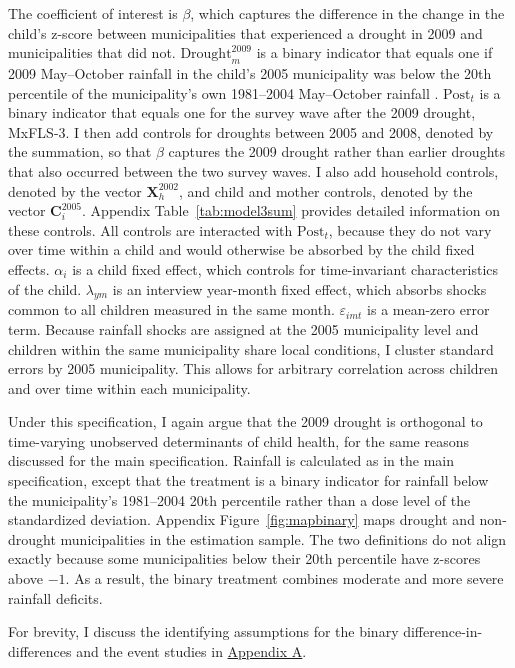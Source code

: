 \documentclass[12pt]{article}
\begin{document}
The coefficient of interest is $\beta$, which captures the difference in the change in the child's z-score between municipalities that experienced a drought in 2009 and municipalities that did not. $\text{Drought}_m^{2009}$ is a binary indicator that equals one if 2009 May--October rainfall in the child's 2005 municipality was below the 20th percentile of the municipality's own 1981--2004 May--October rainfall \parencite{shahDroughtOpportunitiesContemporaneous2017}. $\text{Post}_t$ is a binary indicator that equals one for the survey wave after the 2009 drought, MxFLS-3. I then add controls for droughts between 2005 and 2008, denoted by the summation, so that $\beta$ captures the 2009 drought rather than earlier droughts that also occurred between the two survey waves. I also add household controls, denoted by the vector $\mathbf{X}_h^{2002}$, and child and mother controls, denoted by the vector $\mathbf{C}_i^{2005}$. Appendix Table~\ref{tab:model3sum} provides detailed information on these controls. All controls are interacted with $\text{Post}_t$, because they do not vary over time within a child and would otherwise be absorbed by the child fixed effects. $\alpha_i$ is a child fixed effect, which controls for time-invariant characteristics of the child. $\lambda_{ym}$ is an interview year-month fixed effect, which absorbs shocks common to all children measured in the same month. $\varepsilon_{imt}$ is a mean-zero error term. Because rainfall shocks are assigned at the 2005 municipality level and children within the same municipality share local conditions, I cluster standard errors by 2005 municipality. This allows for arbitrary correlation across children and over time within each municipality.

Under this specification, I again argue that the 2009 drought is orthogonal to time-varying unobserved determinants of child health, for the same reasons discussed for the main specification. Rainfall is calculated as in the main specification, except that the treatment is a binary indicator for rainfall below the municipality's 1981--2004 20th percentile rather than a dose level of the standardized deviation. Appendix Figure~\ref{fig:mapbinary} maps drought and non-drought municipalities in the estimation sample. The two definitions do not align exactly because some municipalities below their 20th percentile have z-scores above $-1$. As a result, the binary treatment combines moderate and more severe rainfall deficits.

For brevity, I discuss the identifying assumptions for the binary difference-in-differences and the event studies in \hyperref[app:binary]{Appendix A}.
\end{document}
